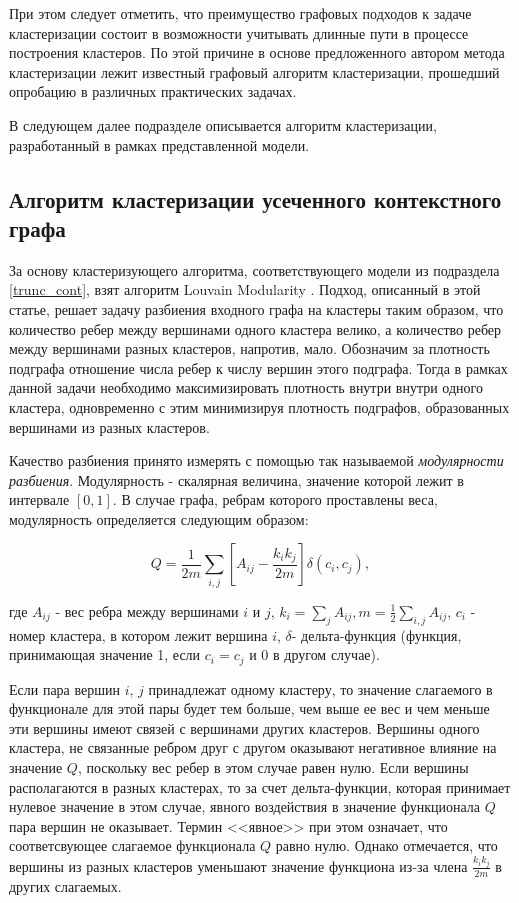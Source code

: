 При этом следует отметить, что преимущество графовых подходов к задаче кластеризации состоит в возможности учитывать длинные пути в процессе построения кластеров. По этой причине в основе предложенного автором метода кластеризации лежит известный графовый алгоритм кластеризации, прошедший опробацию в различных практических задачах.

В следующем далее подразделе описывается алгоритм кластеризации, разработанный в рамках представленной модели.

\subsection{Алгоритм кластеризации усеченного контекстного графа} \label{clustering_algo}

За основу кластеризующего алгоритма, соответствующего модели из подраздела \ref{trunc_cont}, взят алгоритм Louvain Modularity \cite{louvain_modularity}. Подход, описанный в этой статье, решает задачу разбиения входного графа на кластеры таким образом, что количество ребер между вершинами одного кластера велико, а количество ребер между вершинами разных кластеров, напротив, мало. Обозначим за плотность подграфа отношение числа ребер к числу вершин этого подграфа. Тогда в рамках данной задачи необходимо максимизировать плотность внутри внутри одного кластера, одновременно с этим минимизируя плотность подграфов, образованных вершинами из разных кластеров.

Качество разбиения принято измерять с помощью так называемой \emph{модулярности разбиения}. Модулярность - скалярная величина, значение которой лежит в интервале $[0, 1]$. В случае графа, ребрам которого проставлены веса, модулярность определяется следующим образом:

$$ Q = \frac{1}{2m}\sum_{i,j}[A_{ij} - \frac{k_i k_j}{2m}]\delta(c_i, c_j),$$

где $A_{ij}$ - вес ребра между вершинами $i$ и $j$, $k_i=\sum_j{A_{ij}}, m=\frac{1}{2}\sum_{i,j}A_{ij}$, $c_i$ - номер кластера, в котором лежит вершина $i$, $\delta$- дельта-функция (функция, принимающая значение 1, если $c_i=c_j$ и 0 в другом случае).

Если пара вершин $i$, $j$ принадлежат одному кластеру, то значение слагаемого в функционале для этой пары будет тем больше, чем выше ее вес и чем меньше эти вершины имеют связей с вершинами других кластеров. Вершины одного кластера, не связанные ребром друг с другом оказывают негативное влияние на значение $Q$, поскольку вес ребер в этом случае равен нулю. Если вершины располагаются в разных кластерах, то за счет дельта-функции, которая принимает нулевое значение в этом случае, явного воздействия в значение функционала $Q$ пара вершин не оказывает. Термин <<явное>> при этом означает, что соответсвующее слагаемое функционала $Q$ равно нулю. Однако отмечается, что вершины из разных кластеров уменьшают значение функциона из-за члена $\frac{k_i k_j}{2m}$ в других слагаемых.

